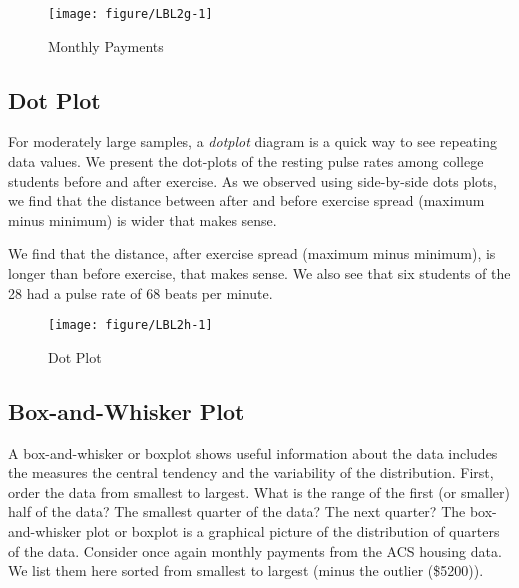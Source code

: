 \documentclass[11pt]{book}\usepackage[]{graphicx}\usepackage[]{color}
\begin{document}

\begin{figure}[ht]

\caption{Monthly Payments }



{\centering \texttt{[image: figure/LBL2g-1]} 

}




\end{figure}

\subsection{Dot Plot}

For moderately large samples, a \textit{dotplot} diagram is a quick way to see repeating data values.  We present the dot-plots of the resting pulse rates among college students before and after exercise.  As we observed using side-by-side dots plots, we find that the distance between after and before exercise spread (maximum minus minimum) is wider that makes sense.

We find that the distance, after exercise spread (maximum minus minimum), is longer than before exercise, that makes sense.  We also see that six students of the 28 had a pulse rate of 68 beats per minute.

\begin{figure}[ht]

\caption{Dot Plot }



{\centering \texttt{[image: figure/LBL2h-1]} 

}




\end{figure}

\newpage

\subsection{Box-and-Whisker Plot}

A box-and-whisker or boxplot shows useful information about the data includes the measures the central tendency and the variability of the distribution.  First, order the data from smallest to largest.  What is the range of the first (or smaller) half of the data?  The smallest quarter of the data?  The next quarter?  The box-and-whisker plot or boxplot is a graphical picture of the distribution of quarters of the data.  Consider once again monthly payments from the ACS housing data.  We list them here sorted from smallest to largest (minus the outlier  (\$5200)).
\end{document}
